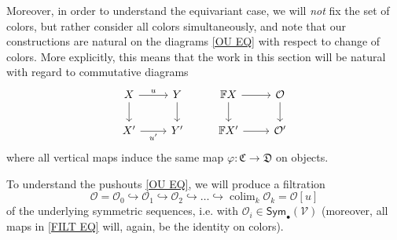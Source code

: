 \documentclass[a4paper,10pt
]{article}%
\numberwithin{equation}{section}
\numberwithin{figure}{section}
\theoremstyle{definition} %
\newcommand{\into}{\hookrightarrow}%
\DeclareMathOperator{\colim}{colim}%
\renewcommand{\O}{\ensuremath{\mathcal O}}
\newcommand{\1}{\ensuremath{\mathbbm 1}}%
\begin{document}
Moreover, in order to understand the equivariant case, 
we will \emph{not} fix the set of colors,  
but rather consider all colors simultaneously, 
and note that our constructions are natural 
on the diagrams \eqref{OU EQ} with respect to change of colors.
More explicitly, this means that the work in this section will be natural with regard to commutative diagrams
\begin{equation}\label{COLORCHNAT EQ}
\begin{tikzcd}
X \arrow[r, "u"',swap] \arrow[d]
&
Y \arrow[d]
&
\mathbb F X \arrow[d] \arrow[r]
&
\O \arrow[d]
\\
X' \arrow[r, "u'"']
&
Y'
&
\mathbb F X' \arrow[r]
&
\O'
\end{tikzcd}
\end{equation}
where all vertical maps induce the same map 
$\varphi \colon \mathfrak{C} \to \mathfrak{D}$ on objects.


To understand the pushouts \eqref{OU EQ},
we will produce a filtration
\begin{equation}\label{FILT EQ}
\O = \O_0 \into \O_1 \into \O_2 \into \dots \into \colim_k \O_k = \O[u]
\end{equation}
of the underlying symmetric sequences, i.e. with 
$\mathcal{O}_i \in \mathsf{Sym}_{\bullet}(\mathcal{V})$
(moreover, all maps in \eqref{FILT EQ} will, again, be the identity on colors).
\end{document}
